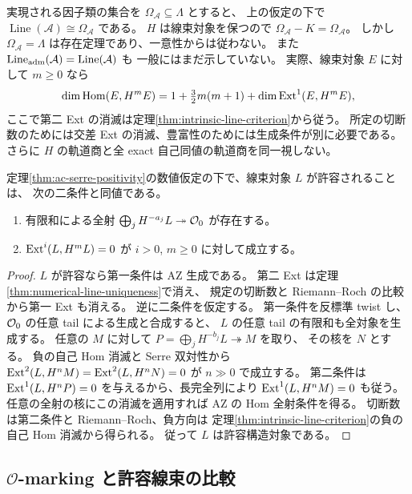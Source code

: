 \begin{remark}\label{rem:line-realization-set}
実現される因子類の集合を $\Omega_{\mathcal A}\subseteq\Lambda$ とすると、
上の仮定の下で $\operatorname{Line}(\mathcal A)\cong\Omega_{\mathcal A}$ である。
$H$ は線束対象を保つので $\Omega_{\mathcal A}-K=\Omega_{\mathcal A}$。
しかし $\Omega_{\mathcal A}=\Lambda$ は存在定理であり、一意性からは従わない。
また $\operatorname{Line}_{\rm adm}(\mathcal A)=\operatorname{Line}(\mathcal A)$ も
一般にはまだ示していない。
実際、線束対象 $E$ に対して $m\ge0$ なら
\[
 \dim\operatorname{Hom}(E,H^mE)
 =1+\tfrac32m(m+1)+\dim\operatorname{Ext}^1(E,H^mE),
\]
ここで第二 Ext の消滅は定理\ref{thm:intrinsic-line-criterion}から従う。
所定の切断数のためには交差 Ext の消滅、豊富性のためには生成条件が別に必要である。
さらに $H$ の軌道商と全 exact 自己同値の軌道商を同一視しない。
\end{remark}

\begin{proposition}\label{prop:line-admissibility-test}
定理\ref{thm:ac-serre-positivity}の数値仮定の下で、線束対象 $L$ が許容されることは、
次の二条件と同値である。
\begin{enumerate}
\item 有限和による全射 $\bigoplus_j H^{-a_j}L\twoheadrightarrow\mathcal O_0$ が存在する。
\item $\operatorname{Ext}^{i}(L,H^mL)=0$ が $i>0$, $m\ge0$ に対して成立する。
\end{enumerate}
\end{proposition}
\begin{proof}
$L$ が許容なら第一条件は AZ 生成である。
第二 Ext は定理\ref{thm:numerical-line-uniqueness}で消え、
規定の切断数と Riemann--Roch の比較から第一 Ext も消える。
逆に二条件を仮定する。
第一条件を反標準 twist し、$\mathcal O_0$ の任意 tail による生成と合成すると、
$L$ の任意 tail の有限和も全対象を生成する。
任意の $M$ に対して $P=\bigoplus_jH^{-b_j}L\twoheadrightarrow M$ を取り、
その核を $N$ とする。
負の自己 Hom 消滅と Serre 双対性から
$\operatorname{Ext}^2(L,H^nM)=\operatorname{Ext}^2(L,H^nN)=0$ が $n\gg0$ で成立する。
第二条件は $\operatorname{Ext}^1(L,H^nP)=0$ を与えるから、長完全列により
$\operatorname{Ext}^1(L,H^nM)=0$ も従う。
任意の全射の核にこの消滅を適用すれば AZ の Hom 全射条件を得る。
切断数は第二条件と Riemann--Roch、負方向は
定理\ref{thm:intrinsic-line-criterion}の負の自己 Hom 消滅から得られる。
従って $L$ は許容構造対象である。
\end{proof}

\subsection{$\mathcal O$-marking と許容線束の比較}

